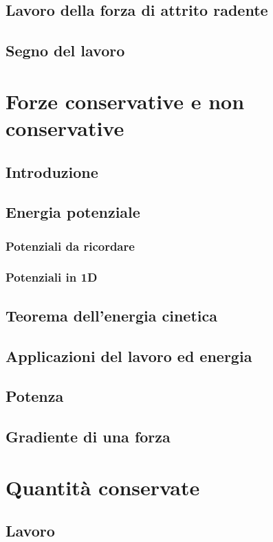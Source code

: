 \documentclass[a4paper]{article}
\begin{document}
\subsection{Lavoro della forza di attrito radente}
\subsection{Segno del lavoro}

\section{Forze conservative e non conservative}
\subsection{Introduzione}
\subsection{Energia potenziale}
\subsubsection*{Potenziali da ricordare}
\subsubsection*{Potenziali in 1D}
\subsection{Teorema dell'energia cinetica}
\subsection{Applicazioni del lavoro ed energia}
\subsection{Potenza}
\subsection{Gradiente di una forza}

\section{Quantità conservate}
\subsection{Lavoro}
\end{document}
